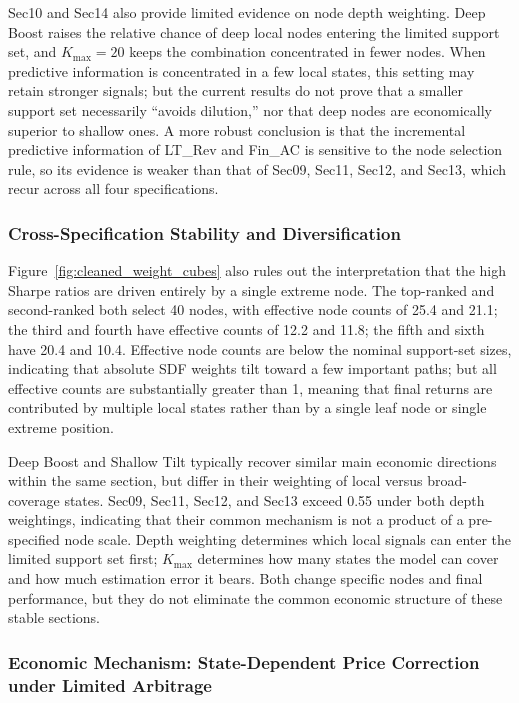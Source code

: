 \documentclass[12pt]{article}
\begin{document}
Sec10 and Sec14 also provide limited evidence on node depth weighting. Deep Boost raises the relative chance of deep local nodes entering the limited support set, and \(K_{\max}=20\) keeps the combination concentrated in fewer nodes. When predictive information is concentrated in a few local states, this setting may retain stronger signals; but the current results do not prove that a smaller support set necessarily ``avoids dilution,'' nor that deep nodes are economically superior to shallow ones. A more robust conclusion is that the incremental predictive information of LT\_Rev and Fin\_AC is sensitive to the node selection rule, so its evidence is weaker than that of Sec09, Sec11, Sec12, and Sec13, which recur across all four specifications.

\subsubsection{Cross-Specification Stability and Diversification}

Figure~\ref{fig:cleaned_weight_cubes} also rules out the interpretation that the high Sharpe ratios are driven entirely by a single extreme node. The top-ranked and second-ranked both select 40 nodes, with effective node counts of 25.4 and 21.1; the third and fourth have effective counts of 12.2 and 11.8; the fifth and sixth have 20.4 and 10.4. Effective node counts are below the nominal support-set sizes, indicating that absolute SDF weights tilt toward a few important paths; but all effective counts are substantially greater than 1, meaning that final returns are contributed by multiple local states rather than by a single leaf node or single extreme position.

Deep Boost and Shallow Tilt typically recover similar main economic directions within the same section, but differ in their weighting of local versus broad-coverage states. Sec09, Sec11, Sec12, and Sec13 exceed 0.55 under both depth weightings, indicating that their common mechanism is not a product of a pre-specified node scale. Depth weighting determines which local signals can enter the limited support set first; \(K_{\max}\) determines how many states the model can cover and how much estimation error it bears. Both change specific nodes and final performance, but they do not eliminate the common economic structure of these stable sections.

\subsubsection{Economic Mechanism: State-Dependent Price Correction under Limited Arbitrage}
\end{document}
